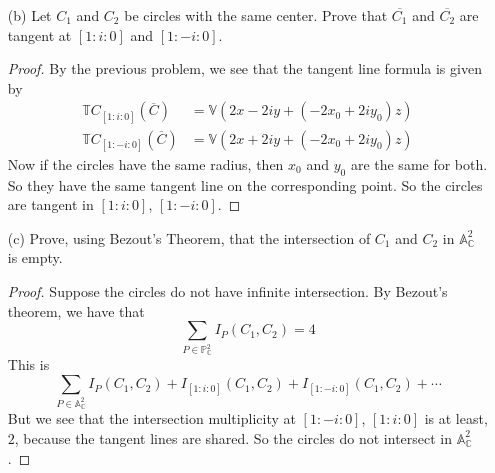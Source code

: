 \documentclass{article}
\begin{document}
\begin{itemize}
        \item [(b)] Let $C_{1}$ and $C_{2}$ be circles with the same center. Prove that $\overline{C_{1}}$ and $\overline{C_{2}}$ are tangent at $[1 : i : 0]$ and $[1 : -i : 0]$. 
            \begin{proof}
                By the previous problem, we see that the tangent line formula is given by
                    \begin{align*}
                        \mathbb{T}C_{[1 : i : 0]}(\overline{C})  &= \mathbb{V}(2x - 2iy + (-2x_{0} + 2iy_{0})z) \\
                        \mathbb{T}C_{[1 : -i : 0]}(\overline{C}) &= \mathbb{V}(2x + 2iy + (-2x_{0} + 2iy_{0})z)   
                    \end{align*}
                Now if the circles have the same radius, then $x_{0}$ and $y_{0}$ are the same for both. So they have the same tangent line on the corresponding point. So the circles are tangent in $[1 : i : 0]$, $[1 : -i : 0]$.
            \end{proof}

        \item [(c)] Prove, using Bezout's Theorem, that the intersection of $C_{1}$ and $C_{2}$ in $\mathbb{A}_{\mathbb{C}}^{2}$ is empty. 
            \begin{proof}
                Suppose the circles do not have infinite intersection. By Bezout's theorem, we have that 
                    \begin{equation*}
                        \sum_{P \in \mathbb{P}^{2}_{\mathbb{C}}}I_{P}(C_{1}, C_{2}) = 4
                    \end{equation*}
                This is 
                    \begin{equation*}
                        \sum_{P \in \mathbb{A}_{\mathbb{C}}^{2}} I_{P}(C_{1}, C_{2}) + I_{[1 : i : 0]}(C_{1}, C_{2}) + I_{[1 : -i : 0]}(C_{1}, C_{2}) + \cdots
                    \end{equation*}
                But we see that the intersection multiplicity at $[1 : -i : 0]$, $[1 : i : 0]$ is at least, $2$, because the tangent lines are shared. So the circles do not intersect in $\mathbb{A}_{\mathbb{C}}^{2}$.
            \end{proof}
    \end{itemize}
\end{document}
